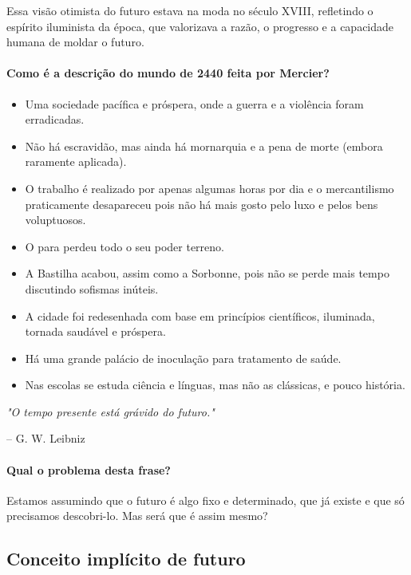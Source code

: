 Essa visão otimista do futuro estava na moda no século XVIII, refletindo o espírito iluminista da época, que valorizava a razão, o progresso e a capacidade humana de moldar o futuro.


\paragraph{Como é a descrição do mundo de 2440 feita por Mercier?}
\begin{itemize}
  \item Uma sociedade pacífica e próspera, onde a guerra e a violência foram erradicadas.
  \item Não há escravidão, mas ainda há mornarquia e a pena de morte (embora raramente aplicada).
  \item O trabalho é realizado por apenas algumas horas por dia e o mercantilismo praticamente desapareceu pois não há mais gosto pelo luxo e pelos bens voluptuosos.
  \item O para perdeu todo o seu poder terreno.
  \item A Bastilha acabou, assim como a Sorbonne, pois não se perde mais tempo discutindo sofismas inúteis.
  \item A cidade foi redesenhada com base em princípios científicos, iluminada, tornada saudável e próspera.
  \item Há uma grande palácio de inoculação para tratamento de saúde.
  \item Nas escolas se estuda ciência e línguas, mas não as clássicas, e pouco história.
\end{itemize}


\begin{thinkerquote}
  \textit{"O tempo presente está grávido do futuro."}
  \begin{flushright}
    -- G. W. Leibniz
  \end{flushright}
\end{thinkerquote}

\paragraph{Qual o problema desta frase?} Estamos assumindo que o futuro é algo fixo e determinado, que já existe e que só precisamos descobri-lo. Mas será que é assim mesmo?

\subsection*{Conceito implícito de futuro}

